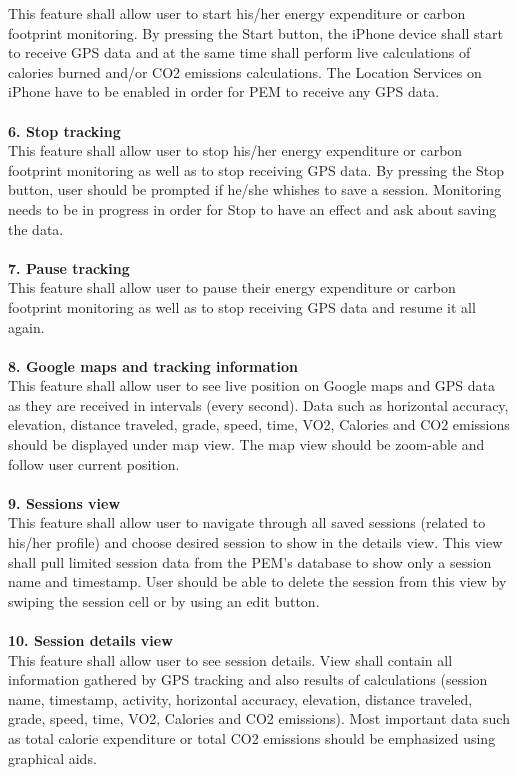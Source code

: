\documentclass[12pt, a4paper]{report}   %
\begin{document}
\begin{enumerate}
This feature shall allow user to start his/her energy expenditure or carbon footprint monitoring. By pressing the Start button, the iPhone device shall start to receive GPS data and at the same time shall perform live calculations of calories burned and/or CO2 emissions calculations. The Location Services on iPhone have to be enabled in order for PEM to receive any GPS data.\\ \\
\textbf{6. Stop tracking}\\
This feature shall allow user to stop his/her energy expenditure or carbon footprint monitoring as well as to stop receiving GPS data. By pressing the Stop button, user should be prompted if he/she whishes to save a session. Monitoring needs to be in progress in order for Stop to have an effect and ask about saving the data.\\ \\
\textbf{7. Pause tracking}\\
This feature shall allow user to pause their energy expenditure or carbon footprint monitoring as well as to stop receiving GPS data and resume it all again.\\ \\
\textbf{8. Google maps and tracking information}\\
This feature shall allow user to see live position on Google maps and GPS data as they are received in intervals (every second). Data such as horizontal accuracy, elevation, distance traveled, grade, speed, time, VO2, Calories and CO2 emissions should be displayed under map view. The map view should be zoom-able and follow user current position.\\ \\
\textbf{9. Sessions view}\\
This feature shall allow user to navigate through all saved sessions (related to his/her profile) and choose desired session to show in the details view. This view shall pull limited session data from the PEM's database to show only a session name and timestamp. User should be able to delete the session from this view by swiping the session cell or by using an edit button.\\ \\
\textbf{10. Session details view}\\
This feature shall allow user to see session details. View shall contain all information gathered by GPS tracking and also results of calculations (session name, timestamp, activity, horizontal accuracy, elevation, distance traveled, grade, speed, time, VO2, Calories and CO2 emissions). Most important data such as total calorie expenditure or total CO2 emissions should be emphasized using graphical aids.\\ \\

\end{enumerate}
\end{document}
